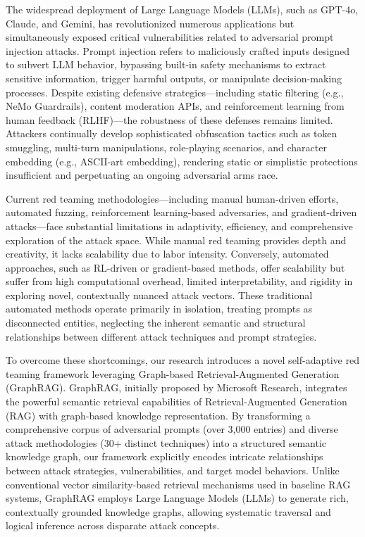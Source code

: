 \documentclass[manuscript,screen,review]{acmart}
\begin{document}
The widespread deployment of Large Language Models (LLMs), such as GPT-4o, Claude, and Gemini, has revolutionized numerous applications but simultaneously exposed critical vulnerabilities related to adversarial prompt injection attacks. Prompt injection refers to maliciously crafted inputs designed to subvert LLM behavior, bypassing built-in safety mechanisms to extract sensitive information, trigger harmful outputs, or manipulate decision-making processes. Despite existing defensive strategies—including static filtering (e.g., NeMo Guardrails\cite{nvidia2023nemo}), content moderation APIs, and reinforcement learning from human feedback (RLHF)—the robustness of these defenses remains limited. Attackers continually develop sophisticated obfuscation tactics such as token smuggling, multi-turn manipulations, role-playing scenarios, and character embedding (e.g., ASCII-art embedding), rendering static or simplistic protections insufficient and perpetuating an ongoing adversarial arms race.

Current red teaming methodologies—including manual human-driven efforts, automated fuzzing\cite{yu2024llmfuzzer}, reinforcement learning-based adversaries, and gradient-driven attacks—face substantial limitations in adaptivity, efficiency, and comprehensive exploration of the attack space. While manual red teaming provides depth and creativity, it lacks scalability due to labor intensity. Conversely, automated approaches, such as RL-driven or gradient-based methods, offer scalability but suffer from high computational overhead, limited interpretability, and rigidity in exploring novel, contextually nuanced attack vectors. These traditional automated methods operate primarily in isolation, treating prompts as disconnected entities, neglecting the inherent semantic and structural relationships between different attack techniques and prompt strategies.

To overcome these shortcomings, our research introduces a novel self-adaptive red teaming framework leveraging Graph-based Retrieval-Augmented Generation (GraphRAG). GraphRAG, initially proposed by Microsoft Research, integrates the powerful semantic retrieval capabilities of Retrieval-Augmented Generation (RAG) with graph-based knowledge representation. By transforming a comprehensive corpus of adversarial prompts (over 3,000 entries) and diverse attack methodologies (30+ distinct techniques) into a structured semantic knowledge graph, our framework explicitly encodes intricate relationships between attack strategies, vulnerabilities, and target model behaviors. Unlike conventional vector similarity-based retrieval mechanisms used in baseline RAG systems, GraphRAG employs Large Language Models (LLMs) to generate rich, contextually grounded knowledge graphs, allowing systematic traversal and logical inference across disparate attack concepts.
\end{document}

